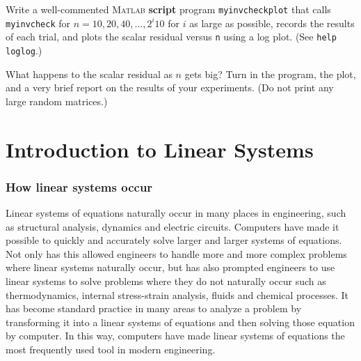 \begin{list}
 \item Write a well-commented \textsc{Matlab} {\bf script} program \verb&myinvcheckplot& that calls
    \verb&myinvcheck& for $n=10,20,40,\ldots,2^i10$ for $i$ as large as possible, 
    records the
    results of each trial, and plots the scalar residual versus \verb&n& 
    using a log plot. (See \verb&help loglog&.)
 
   What happens to the scalar residual as \(n\)
  gets big? Turn in the program, the plot, and a very brief report on
  the results of your experiments.  (Do not print any large random matrices.) 

\end{list}



\chapter{Introduction to Linear Systems}
\label{chp:intro_linsys}

\subsection*{How linear systems occur}


Linear systems of equations naturally occur in many places
in engineering, such as structural analysis, dynamics and
electric circuits. Computers have made it possible to
quickly and accurately solve larger and larger systems
of equations. Not only has this allowed engineers to handle
more and more complex problems where linear systems naturally
occur, but has also prompted engineers to use linear systems
to solve problems where they do not naturally occur such
as thermodynamics, internal stress-strain analysis, fluids and
chemical processes. It has become standard practice in
many areas to analyze a problem by transforming it into a linear
systems of equations and then solving those equation by computer.
In this way, computers have made linear systems of equations
the most frequently used tool in modern engineering.


